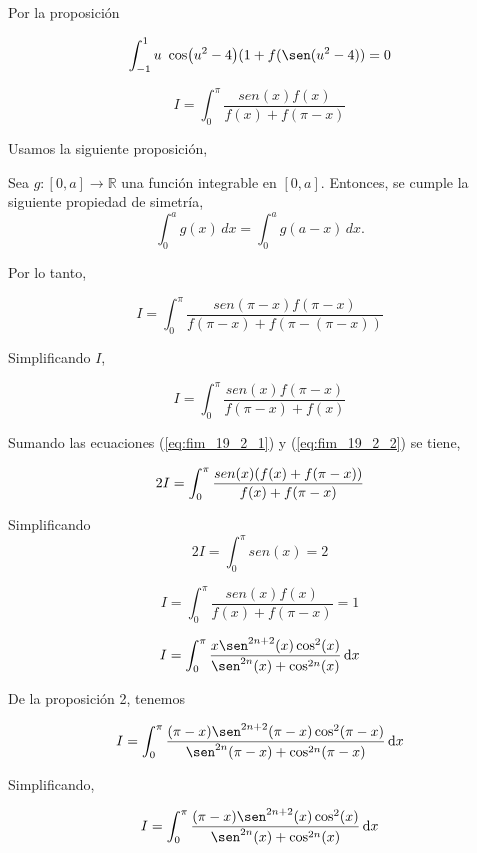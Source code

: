 { Por la proposición
\begin{LnxRptaBox}
	$$
	 \int_{-1}^1 u\ \cos(u^2-4)(1+f(\sen(u^2-4)) = 0 
	$$
\end{LnxRptaBox}


\begin{equation}
I=  \int_{0}^{\pi} \frac{sen(x)f(x)}{f(x)+f(\pi-x)}	
\label{eq:fim_19_2_1}
\end{equation}

Usamos la siguiente proposición,
\begin{proposicion}
	Sea \( g: [0,a] \to \mathbb{R} \) una función integrable en \([0,a]\). Entonces, se cumple la siguiente propiedad de simetría,
	\[
	\int_0^a g(x) \,dx = \int_0^a g(a-x) \,dx.
	\]
\end{proposicion}

Por lo tanto,

$$
I=  \int_{0}^{\pi} \frac{sen(\pi-x)f(\pi-x)}{f(\pi-x)+f(\pi-(\pi-x))}
$$

Simplificando  $I$,

\begin{equation}
I=  \int_{0}^{\pi} \frac{sen(x)f(\pi-x)}{f(\pi-x)+f(x)}
\label{eq:fim_19_2_2}
\end{equation}

Sumando las ecuaciones (\ref{eq:fim_19_2_1}) y  (\ref{eq:fim_19_2_2}) se tiene,

$$
2I=  \int_{0}^{\pi} \frac{sen(x)\pqty{f(x)+f(\pi-x)} }{f(x)+f(\pi-x)}
$$

Simplificando
$$
2I=  \int_{0}^{\pi} sen(x)=2
$$

\begin{LnxRptaBox}
	$$
	I= \int_{0}^{\pi} \frac{sen(x)f(x)}{f(x)+f(\pi-x)}	=  1
	$$
\end{LnxRptaBox}

\begin{equation}
	I=  \int_{0}^{\pi} \frac{x \sen^{2n+2}(x) \cos^2 (x) }{  \sen^{2n}(x) +\cos^{2n}(x)} \dd{x}
	\label{eq:fim_19_2_3}
\end{equation}

De la proposición 2, tenemos

$$
I=  \int_{0}^{\pi} \frac{(\pi-x) \sen^{2n+2}(\pi-x) \cos^2 (\pi-x) }{  \sen^{2n}(\pi-x) +\cos^{2n}(\pi-x)} \dd{x}
$$

Simplificando,

\begin{equation}
	I=  \int_{0}^{\pi} \frac{(\pi-x) \sen^{2n+2}(x) \cos^2 (x) }{  \sen^{2n}(x) +\cos^{2n}(x)}\dd{x}
	\label{eq:fim_19_2_4}
\end{equation}

}
